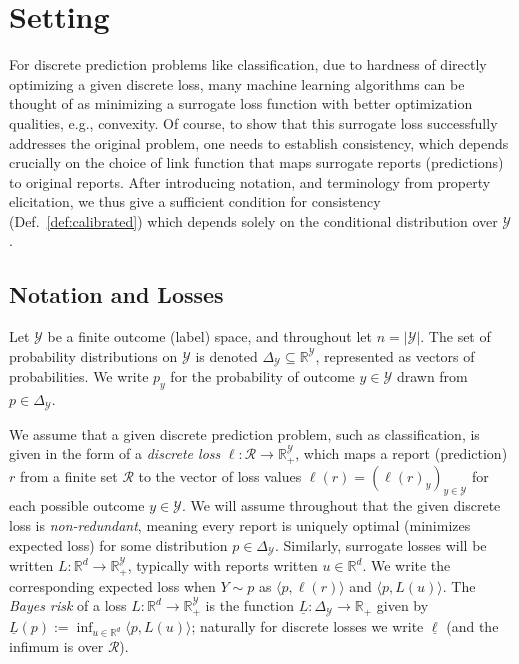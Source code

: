 \documentclass[12pt]{article}
\newcommand{\Comments}{1}
\newcommand{\mytodo}[2]{\ifnum\Comments=1%
  \todo[linecolor=#1!80!black,backgroundcolor=#1,bordercolor=#1!80!black]{#2}\fi}
\newcommand{\btw}[1]{}%
\newcommand{\reals}{\mathbb{R}}
\newcommand{\simplex}{\Delta_\Y}
\newcommand{\R}{\mathcal{R}}
\newcommand{\Y}{\mathcal{Y}}
\newcommand{\risk}[1]{\underline{#1}}
\newcommand{\inprod}[2]{\langle #1, #2 \rangle}%
\begin{document}


\section{Setting}
\label{sec:setting}

For discrete prediction problems like classification, due to hardness of directly optimizing a given discrete loss, many machine learning algorithms can be thought of as minimizing a surrogate loss function with better optimization qualities, e.g., convexity.
Of course, to show that this surrogate loss successfully addresses the original problem, one needs to establish consistency, which depends crucially on the choice of link function that maps surrogate reports (predictions) to original reports.
After introducing notation, and terminology from property elicitation, we thus give a sufficient condition for consistency (Def.~\ref{def:calibrated}) which depends solely on the conditional distribution over $\Y$.

\subsection{Notation and Losses}

Let $\Y$ be a finite outcome (label) space, and throughout let $n=|\Y|$.
The set of probability distributions on $\Y$ is denoted $\simplex\subseteq\reals^{\Y}$, represented as vectors of probabilities.
We write $p_y$ for the probability of outcome $y \in \Y$ drawn from $p \in \simplex$.

We assume that a given discrete prediction problem, such as classification, is given in the form of a \emph{discrete loss} $\ell:\R\to\reals^\Y_+$, which maps a report (prediction) $r$ from a finite set $\R$ to the vector of loss values $\ell(r) = (\ell(r)_y)_{y\in\Y}$ for each possible outcome $y\in\Y$.
We will assume throughout that the given discrete loss is \emph{non-redundant}, meaning every report is uniquely optimal (minimizes expected loss) for some distribution $p\in\simplex$.
Similarly, surrogate losses will be written $L:\reals^d\to\reals^\Y_+$, typically with reports written $u\in\reals^d$.
\btw{Cut generic loss}%
We write the corresponding expected loss when $Y \sim p$ as $\inprod{p}{\ell(r)}$ and $\inprod{p}{L(u)}$.
The \emph{Bayes risk} of a loss $L:\reals^d\to\reals^\Y_+$ is the function $\risk{L}:\simplex\to\reals_+$ given by $\risk{L}(p) := \inf_{u\in\reals^d} \inprod{p}{L(u)}$; naturally for discrete losses we write $\risk{\ell}$ (and the infimum is over $\R$).
\end{document}
